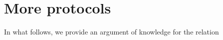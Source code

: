 \documentclass[11pt, lettersize, notitlepage, leqno, footskip=0.6cm]{article}
\newcommand{\slim}{\sum\limits}
\newcommand{\ttt}{\texttt}
\newcommand{\bG}{\mathbb{G}}
\newcommand{\wti}{\widetilde}
\newcommand{\mc}{\mathcal}
\newcommand{\mbf}{\mathbf}
\newcommand{\lam}{\lambda}
\newcommand{\weck}{\widecheck}
\newcommand{\bO}{\mbf{O}}
\newcommand{\mP}{\mc{P}}
\newcommand{\V}{\mc{V}}
\newcommand{\mcM}{\mc{M}}
\newcommand{\vs}{\vspace{-0.15cm}}
\newcommand{\noin}{\noindent}
\numberwithin{equation}{section}
\begin{document}
{\begin{comment}
\noin 6. $\mP$ computes $\weck{A}:= g^{\slim_{i=1}^n \weck{d}_i\gamma^i}$ and sends it to $\V$ along with a non-interactive proof for\\ $\ttt{MultPolyDLog}[g, \;(A_1,\cdots,A_n, A_{\tt{\cup}}, \weck{A}),\; (\weck{f},\wti{f})]$ where \vs $$\weck{f}(X_1,\cdots,X_{n+2}):= X_{n+1}\cdot \Big( \slim_{i=1}^n \frac{\gamma^i}{X_i} \Big)- X_{n+2}\;,\;\wti{f}(X_1,\cdots,X_{n+3}):= X_{n+1}^{n\lam}\cdot\Big(  \slim_{i=1}^n \frac{\gamma^i}{X_i^{n\lam}} \Big)- X_{n+3}.$$


\noin 7. $\mP$ computes $g_1:= g^{e^{n\lam}}, g_2:= g^{e^{n\lam-1}}$ and sends $g_1,g_2$ to $\V$ along with a non-interactive proof for \vs $$\ttt{MultPolyDLog}[g,\; (g_0, g_1,g_2),\; (X_1^{n\lam}-X_2, X_1^{n\lam-1}-X_3)] .$$

\noin 8. $\mP$ computes $\wti{g}_0 := g^{\wti{e}}$ and sends $\wti{g}_0$ to $\V$ along with a non-interactive proof for \vs $$\ttt{PoGCD}[(g, \wti{A}),\;(g,g_1),\;(g,\wti{g}_0)].$$

\noin 9. $\mP$ generates a non-interactive proof for $\ttt{PoKE}[\wti{g}_0,\; g_2] .$ and sends it to $\V$.

\noin 10. $\V$ verifies all the proofs he receives and accepts if and only if they are all valid. \end{prf1}

\noin The proof consists of a constant number of $\bG$-elements and $\bO(n)$ $\lam$-bit integers. As was the case with the protocol for multiset intersections, the proof is simpler in special cases such as when the elements of every $\mcM_i$ are all primes $> 2^{\lam-1}$.


\end{comment}

\newpage



\section{\fontsize{12}{12}\selectfont More protocols}

In what follows, we provide an argument of knowledge for the relation \vs

}
\end{document}

